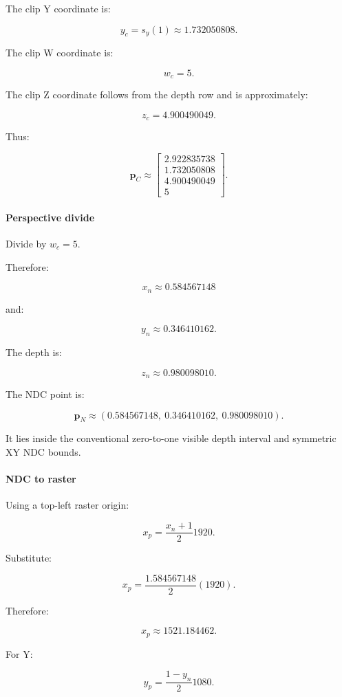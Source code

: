 The clip Y coordinate is:

\[
 y_c=s_y(1)\approx1.732050808.
\]

The clip W coordinate is:

\[
 \boxed{w_c=5}.
\]

The clip Z coordinate follows from the depth row and is approximately:

\[
 z_c=4.900490049.
\]

Thus:

\[
 \boxed{ \mathbf p_C\approx \begin{bmatrix} 2.922835738\\ 1.732050808\\ 4.900490049\\ 5 \end{bmatrix} }.
\]

\paragraph{Perspective divide}\label{perspective-divide}

Divide by \(w_c=5\).

Therefore:

\[
 \boxed{ x_n\approx0.584567148 }
\]

and:

\[
 \boxed{ y_n\approx0.346410162 }.
\]

The depth is:

\[
 \boxed{ z_n\approx0.980098010 }.
\]

The NDC point is:

\[
 \boxed{ \mathbf p_N\approx (0.584567148,\ 0.346410162,\ 0.980098010) }.
\]

It lies inside the conventional zero-to-one visible depth interval and symmetric XY NDC bounds.

\paragraph{NDC to raster}\label{ndc-to-raster}

Using a top-left raster origin:

\[
 x_p=\frac{x_n+1}{2}1920.
\]

Substitute:

\[
 x_p= \frac{1.584567148}{2}(1920).
\]

Therefore:

\[
 \boxed{x_p\approx1521.184462}.
\]

For Y:

\[
 y_p=\frac{1-y_n}{2}1080.
\]

